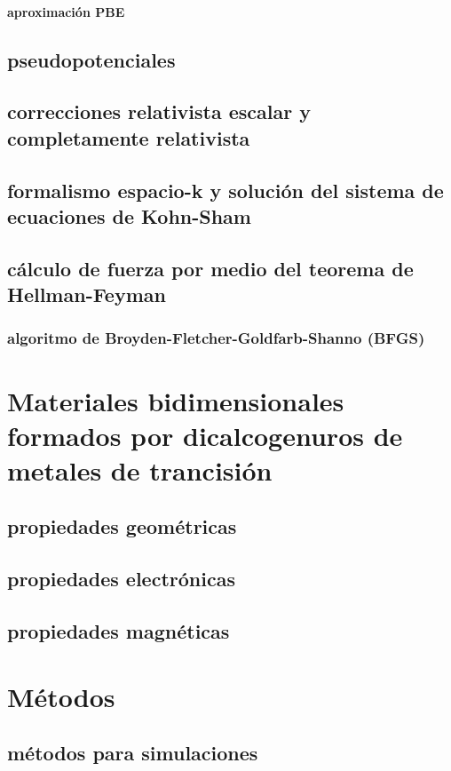 \documentclass[12pt,a4paper]{book}
\begin{document}
	\subsubsection{aproximaci\'on PBE}
	\section{pseudopotenciales}
	\section{correcciones relativista escalar y completamente relativista}
	\section{formalismo espacio-k y soluci\'on del sistema de ecuaciones de Kohn-Sham}
	\section{cálculo de fuerza por medio del teorema de Hellman-Feyman}
	\subsection{algoritmo de Broyden-Fletcher-Goldfarb-Shanno (BFGS)}
	
	\chapter{Materiales bidimensionales formados por dicalcogenuros de metales de trancisi\'on}
	\section{propiedades geom\'etricas}
	\section{propiedades electr\'onicas}
	\section{propiedades magn\'eticas}
	
	\chapter{M\'etodos}
	\section{m\'etodos para simulaciones }
\end{document}
